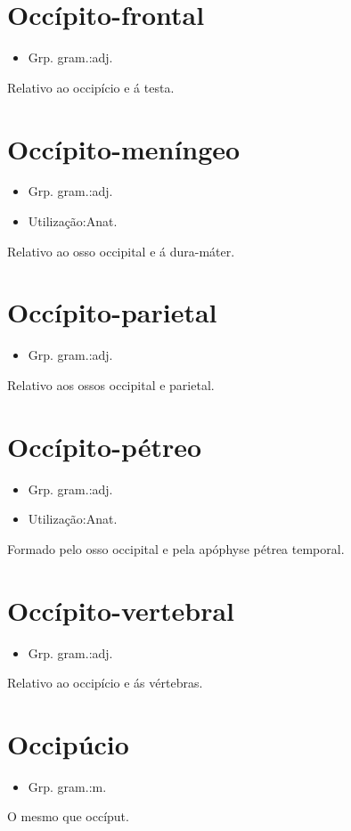 \section{Occípito-frontal}
\begin{itemize}
\item {Grp. gram.:adj.}
\end{itemize}
Relativo ao occipício e á testa.
\section{Occípito-meníngeo}
\begin{itemize}
\item {Grp. gram.:adj.}
\end{itemize}
\begin{itemize}
\item {Utilização:Anat.}
\end{itemize}
Relativo ao osso occipital e á dura-máter.
\section{Occípito-parietal}
\begin{itemize}
\item {Grp. gram.:adj.}
\end{itemize}
Relativo aos ossos occipital e parietal.
\section{Occípito-pétreo}
\begin{itemize}
\item {Grp. gram.:adj.}
\end{itemize}
\begin{itemize}
\item {Utilização:Anat.}
\end{itemize}
Formado pelo osso occipital e pela apóphyse pétrea temporal.
\section{Occípito-vertebral}
\begin{itemize}
\item {Grp. gram.:adj.}
\end{itemize}
Relativo ao occipício e ás vértebras.
\section{Occipúcio}
\begin{itemize}
\item {Grp. gram.:m.}
\end{itemize}
O mesmo que \textunderscore occíput\textunderscore .
